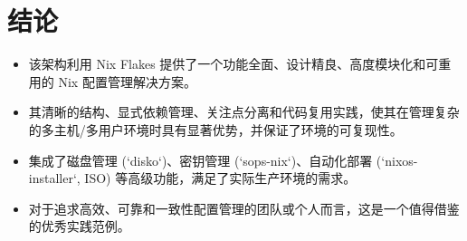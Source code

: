 \documentclass[11pt, a4paper]{article}
\begin{document}
\section{结论}
    \begin{itemize}
        \item 该架构利用 Nix Flakes 提供了一个功能全面、设计精良、高度模块化和可重用的 Nix 配置管理解决方案。
        \item 其清晰的结构、显式依赖管理、关注点分离和代码复用实践，使其在管理复杂的多主机/多用户环境时具有显著优势，并保证了环境的可复现性。
        \item 集成了磁盘管理 (`disko`)、密钥管理 (`sops-nix`)、自动化部署 (`nixos-installer`, ISO) 等高级功能，满足了实际生产环境的需求。
        \item 对于追求高效、可靠和一致性配置管理的团队或个人而言，这是一个值得借鉴的优秀实践范例。
    \end{itemize}

\end{document}
